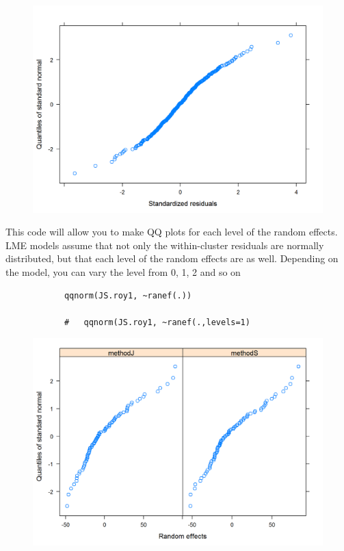 \documentclass[12pt, a4paper]{report}
\theoremstyle{plain}
\theoremstyle{definition}
\theoremstyle{remark}
\begin{document}
		
		\begin{figure}[h!]
			\centering
			\includegraphics[width=0.9\linewidth]{images/ResidPlot3}
			\label{fig:ResidPlot3}
		\end{figure}
		
		This code will allow you to make QQ plots for each level of the random effects.  LME models assume that not only the within-cluster residuals are normally distributed, but that each level of the random effects are as well. Depending on the model, you can vary the level from 0, 1, 2 and so on
		\begin{framed}
			\begin{verbatim}
			qqnorm(JS.roy1, ~ranef(.))
			
			# 	qqnorm(JS.roy1, ~ranef(.,levels=1)
			\end{verbatim}
		\end{framed}
		\begin{figure}[h!]
			\centering
			\includegraphics[width=0.9\linewidth]{images/ResidPlot2}
			\caption{}
			\label{fig:ResidPlot2}
		\end{figure}
		
\end{document}
